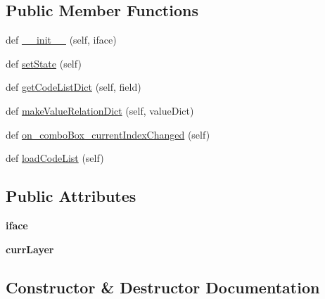 \subsection*{Public Member Functions}
\begin{DoxyCompactItemize}
\item 
def \mbox{\hyperlink{class_dsg_tools_1_1_attribute_tools_1_1code__list_1_1_code_list_ab79f81016ec69893abf40f98519791b5}{\+\_\+\+\_\+init\+\_\+\+\_\+}} (self, iface)
\item 
def \mbox{\hyperlink{class_dsg_tools_1_1_attribute_tools_1_1code__list_1_1_code_list_af2f576bf21080f886795e46d6d093331}{set\+State}} (self)
\item 
def \mbox{\hyperlink{class_dsg_tools_1_1_attribute_tools_1_1code__list_1_1_code_list_ac8a5029bd39e2d9d9b23deb2954cd5a9}{get\+Code\+List\+Dict}} (self, field)
\item 
def \mbox{\hyperlink{class_dsg_tools_1_1_attribute_tools_1_1code__list_1_1_code_list_aa6d24b65dfba750135e6f85d7c47e431}{make\+Value\+Relation\+Dict}} (self, value\+Dict)
\item 
def \mbox{\hyperlink{class_dsg_tools_1_1_attribute_tools_1_1code__list_1_1_code_list_aaa550bd981e4c040fa9b8cd7d44671b1}{on\+\_\+combo\+Box\+\_\+current\+Index\+Changed}} (self)
\item 
def \mbox{\hyperlink{class_dsg_tools_1_1_attribute_tools_1_1code__list_1_1_code_list_a64dfeb9a4e4a4930377640ad21f9f7d2}{load\+Code\+List}} (self)
\end{DoxyCompactItemize}
\subsection*{Public Attributes}
\begin{DoxyCompactItemize}
\item 
\mbox{\label{class_dsg_tools_1_1_attribute_tools_1_1code__list_1_1_code_list_ac99269c856c46dbdb4918cf8a762b505}} 
{\bfseries iface}
\item 
\mbox{\label{class_dsg_tools_1_1_attribute_tools_1_1code__list_1_1_code_list_adc39e3c751aeea211b40a8642fca2fba}} 
{\bfseries curr\+Layer}
\end{DoxyCompactItemize}


\subsection{Constructor \& Destructor Documentation}
\mbox{\label{class_dsg_tools_1_1_attribute_tools_1_1code__list_1_1_code_list_ab79f81016ec69893abf40f98519791b5}} 
